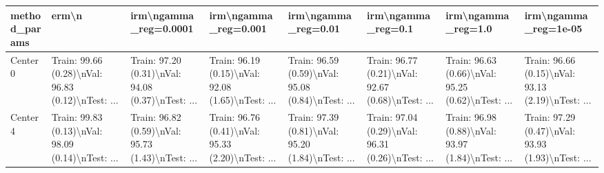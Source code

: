 \begin{tabular}{llllllll}
\toprule
method\_params &                                              erm\textbackslash n &                              irm\textbackslash ngamma\_reg=0.0001 &                               irm\textbackslash ngamma\_reg=0.001 &                                irm\textbackslash ngamma\_reg=0.01 &                                 irm\textbackslash ngamma\_reg=0.1 &                                 irm\textbackslash ngamma\_reg=1.0 &                               irm\textbackslash ngamma\_reg=1e-05 \\
\midrule
Center 0 &  Train: 99.66 (0.28)\textbackslash nVal: 96.83 (0.12)\textbackslash nTest: ... &  Train: 97.20 (0.31)\textbackslash nVal: 94.08 (0.37)\textbackslash nTest: ... &  Train: 96.19 (0.15)\textbackslash nVal: 92.08 (1.65)\textbackslash nTest: ... &  Train: 96.59 (0.59)\textbackslash nVal: 95.08 (0.84)\textbackslash nTest: ... &  Train: 96.77 (0.21)\textbackslash nVal: 92.67 (0.68)\textbackslash nTest: ... &  Train: 96.63 (0.66)\textbackslash nVal: 95.25 (0.62)\textbackslash nTest: ... &  Train: 96.66 (0.15)\textbackslash nVal: 93.13 (2.19)\textbackslash nTest: ... \\
Center 4 &  Train: 99.83 (0.13)\textbackslash nVal: 98.09 (0.14)\textbackslash nTest: ... &  Train: 96.82 (0.59)\textbackslash nVal: 95.73 (1.43)\textbackslash nTest: ... &  Train: 96.76 (0.41)\textbackslash nVal: 95.33 (2.20)\textbackslash nTest: ... &  Train: 97.39 (0.81)\textbackslash nVal: 95.20 (1.84)\textbackslash nTest: ... &  Train: 97.04 (0.29)\textbackslash nVal: 96.31 (0.26)\textbackslash nTest: ... &  Train: 96.98 (0.88)\textbackslash nVal: 93.97 (1.84)\textbackslash nTest: ... &  Train: 97.29 (0.47)\textbackslash nVal: 93.93 (1.93)\textbackslash nTest: ... \\
\bottomrule
\end{tabular}
